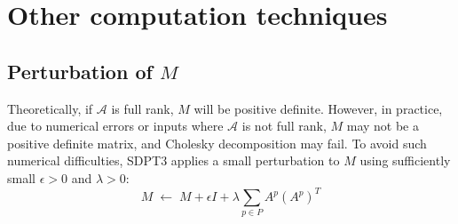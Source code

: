 \section{Other computation techniques}

\subsection{Perturbation of \boldmath $M$ }

Theoretically, if $\mathcal{A}$ is full rank, $M$ will be positive definite. However, in practice, due to numerical errors or inputs where $\mathcal{A}$ is not full rank, $M$ may not be a positive definite matrix, and Cholesky decomposition may fail.  
To avoid such numerical difficulties, SDPT3 applies a small perturbation to $M$ using sufficiently small $\epsilon > 0$ and $\lambda > 0$:
\[
  M \;\leftarrow\; M + \epsilon I + \lambda \sum_{p\in P} A^p (A^p)^T
\]

